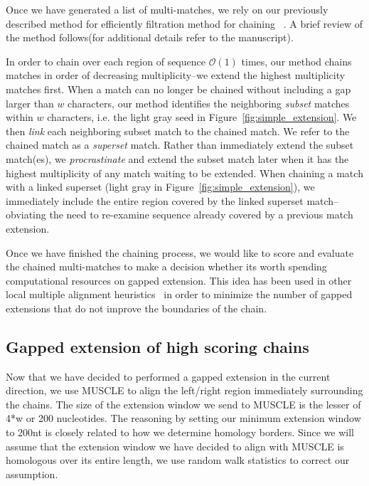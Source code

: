\documentclass{llncs}
\begin{document}
Once we have generated a list of multi-matches, we rely on our previously described method for efficiently filtration method for chaining ~\cite{ref-procrast}. A brief review of the method follows(for additional details refer to the manuscript).

In order to chain over each region of sequence $\mathcal{O}(1)$ times,
our method chains matches in order of decreasing multiplicity--we
extend the highest multiplicity matches first. When a match can no
longer be chained without including a gap larger than $w$
characters, our method identifies the neighboring \textit{subset}
matches within $w$ characters, i.e. the light gray seed in
Figure~\ref{fig:simple_extension}. We then \textit{link} each
neighboring subset match to the chained match. We refer to the
chained match as a \textit{superset} match. Rather than immediately
extend the subset match(es), we \textit{procrastinate} and extend
the subset match later when it has the highest multiplicity of any
match waiting to be extended. When chaining a match with a linked
superset (light gray in Figure~\ref{fig:simple_extension}), we
immediately include the entire region covered by the linked superset
match--obviating the need to re-examine sequence already covered by
a previous match extension.

Once we have finished the chaining process, we would like to score and evaluate the chained multi-matches to make a decision whether its worth spending computational resources on gapped extension. This idea has been used in other local multiple alignment heuristics~\cite{...} in order to minimize the number of gapped extensions that do not improve the boundaries of the chain.

\subsection{Gapped extension of high scoring chains}

Now that we have decided to performed a gapped extension in the current direction, we use MUSCLE to align the left/right region immediately surrounding the chains. The size of the extension window we send to MUSCLE is the lesser of 4*w or 200 nucleotides. The reasoning by setting our minimum extension window to 200nt is closely related to how we determine homology borders. Since we will assume that the extension window we have decided to align with MUSCLE is homologous over its entire length, we use random walk statistics to correct our assumption.
\end{document}
